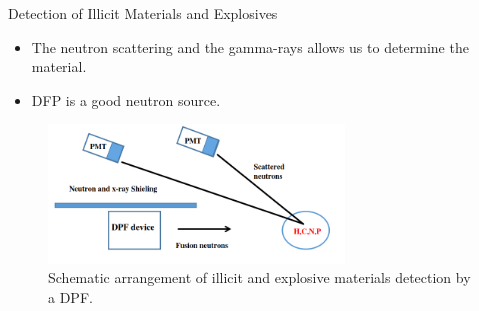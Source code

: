\begin{frame} {Detection of Illicit Materials and Explosives}
    \begin{itemize}
        \item The neutron scattering and the gamma-rays allows us to determine the material.
        \item DFP is a good neutron source.
    \end{itemize}
    \begin{figure}
        \centering
        \includegraphics[width=0.7\textwidth]{figures/detection-of-illicit-material.png}
        \caption{Schematic arrangement of illicit and explosive materials detection by a DPF.}
        \label{fig:detection-of-illicit-material}
    \end{figure}
\end{frame}